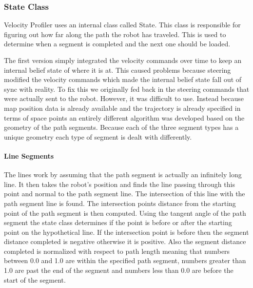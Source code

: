\subsubsection{State Class}
Velocity Profiler uses an internal class called State.  This class is
responsible for figuring out how far along the path the robot has
traveled.  This is used to determine when a segment is completed and
the next one should be loaded.

The first version simply integrated the velocity commands over time to
keep an internal belief state of where it is at. This caused problems because steering modified the velocity commands which made the internal belief state fall out of sync with reality.  To fix this we originally fed back in the steering commands that were actually sent to the robot. However, it was difficult to use. Instead because map position data is already available and the trajectory is already specified in terms of space points an entirely different algorithm was developed based on the geometry of the path segments.  Because each of the three segment types has a unique geometry each type of segment is dealt with differently.

\paragraph{Line Segments}
The lines work by assuming that the path segment is actually an infinitely long line. It then takes the robot's position and finds the line passing through this point and normal to the path segment line. The intersection of this line with the path segment line is found. The intersection points distance from the starting point of the path segment is then computed. Using the tangent angle of the path segment the state class determines if the point is before or after the starting point on the hypothetical line.  If the intersection point is before then the segment distance completed is negative otherwise it is positive. Also the segment distance completed is normalized with respect to path length meaning that numbers between 0.0 and 1.0 are within the specified path segment, numbers greater than 1.0 are past the end of the segment and numbers less than 0.0 are before the start of the segment.

